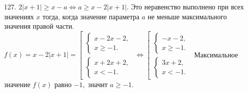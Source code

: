 127. $2|x+1|\geqslant x-a\Leftrightarrow a\geqslant  x-2|x+1|.$ Это неравенство выполнено при всех значениях $x$ тогда, когда значение параметра $a$ не меньше максимального значения правой части. $f(x)=x-2|x+1|=\left[\begin{array}{l}\begin{cases}x-2x-2,\\ x\geqslant -1. \end{cases}\\ \begin{cases}x+2x+2,\\ x< -1. \end{cases}\end{array}\right.\Leftrightarrow\left[\begin{array}{l}\begin{cases}-x-2,\\ x\geqslant -1. \end{cases}\\ \begin{cases}3x+2,\\ x<-1. \end{cases}\end{array}\right.$ Максимальное значение $f(x)$ равно $-1,$ значит $a\geqslant-1.$\\
